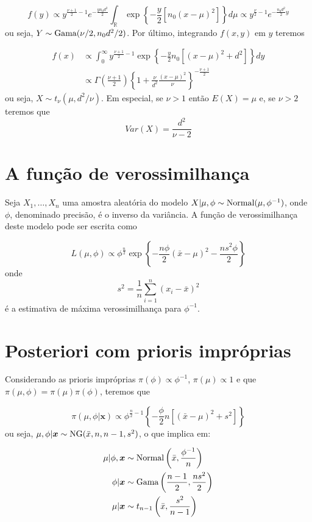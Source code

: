 \documentclass[
  letterpaper,
  DIV=11,
  numbers=noendperiod]{scrreprt}
\theoremstyle{plain}
\theoremstyle{definition}
\theoremstyle{definition}
\theoremstyle{remark}
\begin{document}
\[f(y)\propto y^{\frac{\nu+1}{2}-1}e^{-\frac{yn_0d^2}{2}}\int_{\mathbb{R}}\exp\left\{-\frac{y}{2}\left[n_0(x-\mu)^2\right]\right\}d\mu\propto y^{\frac{\nu}{2}-1}e^{-\frac{n_0d^2}{2}y}\]
ou seja, \(Y\sim\hbox{Gama}(\nu/2, n_0d^2/2)\). Por último, integrando
\(f(x,y)\) em \(y\) teremos

\[\begin{align}f(x)&\propto \int_0^\infty y^{\frac{\nu+1}{2}-1}\exp\left\{-\frac{y}{2}n_0\left[(x-\mu)^2 + d^2\right]\right\}dy \\&\propto \Gamma\left(\frac{\nu+1}{2}\right)\left\{1+\frac{\nu}{d^2}\frac{(x-\mu)^2}{\nu}\right\}^{-\frac{\nu+1}{2}}\end{align}\]
ou seja, \(X\sim t_{\nu}(\mu, d^2/\nu)\). Em especial, se \(\nu>1\)
então \(E(X)=\mu\) e, se \(\nu>2\) teremos que
\[Var(X)=\frac{d^2}{\nu-2}\]

\section{A função de
verossimilhança}\label{a-funuxe7uxe3o-de-verossimilhanuxe7a-1}

Seja \(X_1,\ldots,X_n\) uma amostra aleatória do modelo
\(X|\mu,\phi\sim\hbox{Normal}(\mu,\phi^{-1})\), onde \(\phi\),
denominado precisão, é o inverso da variância. A função de
verossimilhança deste modelo pode ser escrita como

\[L(\mu,\phi)\propto \phi^{\frac{n}{2}}\exp\left\{-\frac{n\phi}{2}(\bar{x}-\mu)^2 -\frac{ns^2\phi}{2}\right\}\]
onde \[s^2=\frac{1}{n}\sum_{i=1}^n(x_i-\bar{x})^2\] é a estimativa de
máxima verossimilhança para \(\phi^{-1}\).

\section{Posteriori com prioris
impróprias}\label{posteriori-com-prioris-impruxf3prias}

Considerando as prioris impróprias \(\pi(\phi)\propto \phi^{-1}\),
\(\pi(\mu)\propto 1\) e que \(\pi(\mu,\phi)=\pi(\mu)\pi(\phi)\), teremos
que

\[\pi(\mu,\phi|\boldsymbol{x})\propto \phi^{\frac{n}{2}-1}\left\{-\frac{\phi}{2}n\left[ (\bar{x}-\mu)^2 +s^2\right]\right\}\]
ou seja, \(\mu,\phi|\boldsymbol{x}\sim\hbox{NG}(\bar{x},n,n-1,s^2)\), o
que implica em:

\[\begin{align}
\mu|\phi,\boldsymbol{x}&\sim\hbox{Normal}\left(\bar{x},\frac{\phi^{-1}}{n}\right)\\
\phi|\boldsymbol{x}&\sim\hbox{Gama}\left(\frac{n-1}{2},\frac{ns^2}{2}\right)\\
\mu|\boldsymbol{x}&\sim t_{n-1}\left(\bar{x},\frac{s^2}{n-1}\right)
\end{align}\]
\end{document}
